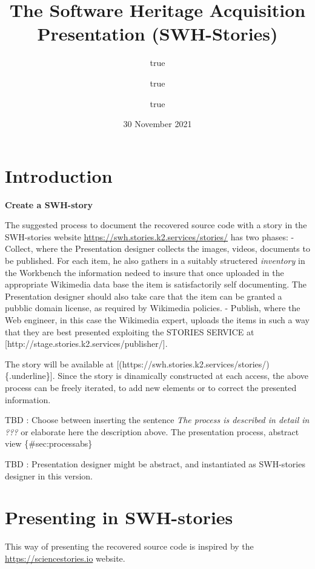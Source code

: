 \documentclass[]{article}
\title{The Software Heritage Acquisition Presentation (SWH-Stories)}
\author{true \and true \and true}
\date{30 November 2021}
\begin{document}
\maketitle

{
\setcounter{tocdepth}{3}
\tableofcontents
}
\hypertarget{introduction}{%
\section{Introduction}\label{introduction}}

\textbf{Create a SWH-story}

The suggested process to document the recovered source code with a story
in the SWH-stories website
\href{https://swh.stories.k2.services/stories/}{{https://swh.stories.k2.services/stories/}}
has two phases: - Collect, where the Presentation designer collects the
images, videos, documents to be published. For each item, he also
gathers in a suitably structered \emph{inventory} in the Workbench the
information nedeed to insure that once uploaded in the appropriate
Wikimedia data base the item is satisfactorily self documenting. The
Presentation designer should also take care that the item can be granted
a pubblic domain license, as required by Wikimedia policies. - Publish,
where the Web engineer, in this case the Wikimedia expert, uploads the
items in such a way that they are best presented exploiting the STORIES
SERVICE at {[}{http://stage.stories.k2.services/publisher/}{]}.

The story will be available at
{[}(https://swh.stories.k2.services/stories/)\{.underline\}{]}. Since
the story is dinamically constructed at each access, the above process
can be freely iterated, to add new elements or to correct the presented
information.

TBD : Choose between inserting the sentence \emph{The process is
described in detail in ???} or elaborate here the description above. The
presentation process, abstract view \{\#sec:processabs\}

TBD : Presentation designer might be abstract, and instantiated as
SWH-stories designer in this version.

\hypertarget{presenting-in-swh-stories}{%
\section{Presenting in SWH-stories}\label{presenting-in-swh-stories}}

This way of presenting the recovered source code is inspired by the
\href{https://sciencestories.io}{{https://sciencestories.io}} website.
\end{document}
